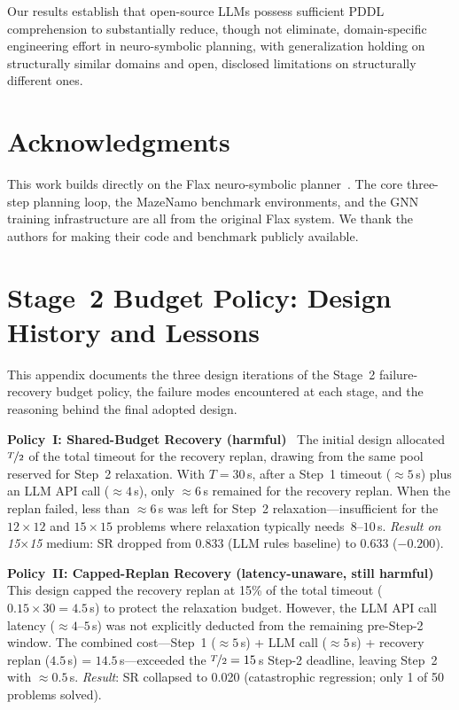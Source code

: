 \documentclass[letterpaper, 10pt, journal, twoside]{IEEEtran}
\newcommand{\myparagraph}[1]{\noindent\textbf{#1}~}
\begin{document}
Our results establish that open-source LLMs possess sufficient PDDL comprehension to substantially reduce, though not eliminate, domain-specific engineering effort in neuro-symbolic planning, with generalization holding on structurally similar domains and open, disclosed limitations on structurally different ones.


\section*{Acknowledgments}
This work builds directly on the Flax neuro-symbolic planner~\cite{du2026fast}.
The core three-step planning loop, the MazeNamo benchmark environments, and the GNN training infrastructure are all from the original Flax system.
We thank the authors for making their code and benchmark publicly available.




\clearpage
\appendix

\section{Stage~2 Budget Policy: Design History and Lessons}
\label{app:budget}

This appendix documents the three design iterations of the Stage~2 failure-recovery budget policy, the failure modes encountered at each stage, and the reasoning behind the final adopted design.

\myparagraph{Policy~I: Shared-Budget Recovery (harmful)}
The initial design allocated $\nicefrac{T}{2}$ of the total timeout for the recovery replan, drawing from the same pool reserved for Step~2 relaxation.
With $T{=}30$\,s, after a Step~1 timeout (${\approx}5$\,s) plus an LLM API call (${\approx}4$\,s), only ${\approx}6$\,s remained for the recovery replan.
When the replan failed, less than ${\approx}6$\,s was left for Step~2 relaxation—insufficient for the $12{\times}12$ and $15{\times}15$ problems where relaxation typically needs~$8$--$10$\,s.
\emph{Result on 15$\times$15} medium: SR dropped from 0.833 (LLM rules baseline) to 0.633 ($-0.200$).

\myparagraph{Policy~II: Capped-Replan Recovery (latency-unaware, still harmful)}
This design capped the recovery replan at 15\% of the total timeout ($0.15 \times 30 = 4.5$\,s) to protect the relaxation budget.
However, the LLM API call latency (${\approx}4$--$5$\,s) was not explicitly deducted from the remaining pre-Step-2 window.
The combined cost—Step~1 (${\approx}5$\,s) + LLM call (${\approx}5$\,s) + recovery replan ($4.5$\,s) = $14.5$\,s—exceeded the $\nicefrac{T}{2} = 15$\,s Step-2 deadline, leaving Step~2 with ${\approx}0.5$\,s.
\emph{Result}: SR collapsed to 0.020 (catastrophic regression; only 1 of 50 problems solved).
\end{document}
